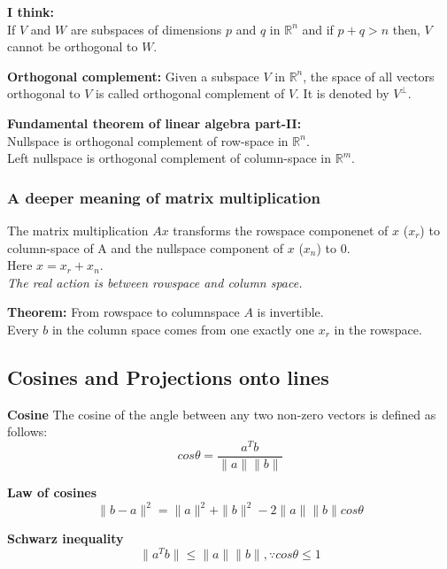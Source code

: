 \begin{mdframed}[backgroundcolor=gray!20]
\textbf{I think:}\\
If $V$ and $W$ are subspaces of dimensions $p$ and $q$ in $\mathbb{R}^n$ and if $p + q > n$ then, $V$ cannot be orthogonal to $W$.  
\end{mdframed}

\textbf{Orthogonal complement:} Given a subspace $V$ in $\mathbb{R}^n$, the space of all vectors orthogonal to $V$ is called orthogonal complement of $V$. It is denoted by $V^{\perp}$.

\begin{mdframed}[backgroundcolor=gray!20]
\textbf{Fundamental theorem of linear algebra part-II:}\\
Nullspace is orthogonal complement of row-space in $\mathbb{R}^n$.\\
Left nullspace is orthogonal complement of column-space in $\mathbb{R}^m$.
\end{mdframed}

\subsubsection{A deeper meaning of matrix multiplication}
The matrix multiplication $Ax$ transforms the rowspace componenet of $x$ ($x_r$) to column-space of A and the nullspace component of $x$ ($x_n$) to $0$.\\
Here $x = x_r + x_n$.\\
\textit{The real action is between rowspace and column space.}
\begin{mdframed}[backgroundcolor=gray!20]
\textbf{Theorem:} From rowspace to columnspace $A$ is invertible. \\
Every $b$ in the column space comes from one exactly one $x_r$ in the rowspace.
\end{mdframed}



\subsection{Cosines and Projections onto lines}

\textbf{Cosine} The cosine of the angle between any two non-zero vectors is defined as follows:
$$cos\theta = \frac{a^Tb}{\|a\|\|b\|}$$

\textbf{Law of cosines}
$$\|b - a\|^2 = \|a\|^2 + \|b\|^2 - 2\|a\|\|b\|cos\theta$$

\textbf{Schwarz inequality}
$$\|a^Tb\| \leq \|a\|\|b\|, \because cos\theta \leq 1$$\\

